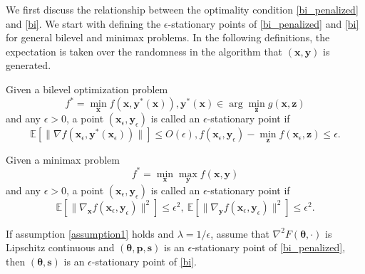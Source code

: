 We first discuss the relationship between the optimality condition \eqref{bi_penalized} and \eqref{bi}. We start with defining the $\epsilon$-stationary points of \eqref{bi_penalized} and \eqref{bi} for general bilevel and minimax problems. In the following definitions, the expectation is taken over the randomness in the algorithm that $({ \mathbf{x}},{ \mathbf{y}})$ is generated.

\begin{definition}
Given a bilevel optimization problem $$f^*=\min_{ \mathbf{x}} f({ \mathbf{x}},{ \mathbf{y}}^*({ \mathbf{x}})), { \mathbf{y}}^*({ \mathbf{x}})\in \arg\min_{ \mathbf{z}} g({ \mathbf{x}},{ \mathbf{z}})$$ and any $\epsilon>0$, a point $({ \mathbf{x}}_\epsilon,{ \mathbf{y}}_\epsilon)$ is called an $\epsilon$-stationary point if 
$$\mathbb{E}[\|\nabla f({ \mathbf{x}}_\epsilon,{ \mathbf{y}}^*({ \mathbf{x}}_\epsilon))\|]\leq O(\epsilon), f({ \mathbf{x}}_\epsilon,{ \mathbf{y}}_\epsilon)-\min_{ \mathbf{z}} f({ \mathbf{x}}_\epsilon,{ \mathbf{z}})\leq \epsilon.$$
\end{definition}

\begin{definition}
\label{definition1}
Given a minimax problem $$f^*=\min_{ \mathbf{x}}\max_{ \mathbf{y}} f({ \mathbf{x}},{ \mathbf{y}})$$ and any $\epsilon>0$, a point $({ \mathbf{x}}_\epsilon,{ \mathbf{y}}_\epsilon)$ is called an $\epsilon$-stationary point if 
$$\mathbb{E}[\|\nabla_{ \mathbf{x}} f({ \mathbf{x}}_\epsilon,{ \mathbf{y}}_\epsilon)\|^2]\leq\epsilon^2,\ \mathbb{E}[\|\nabla_{ \mathbf{y}} f({ \mathbf{x}}_\epsilon,{ \mathbf{y}}_\epsilon)\|^2]\leq\epsilon^2.$$
\end{definition}



\begin{lemma}
\label{lemma1}
    If assumption \ref{assumption1} holds and $\lambda=1/\epsilon$, assume that $\nabla^2 F({ \mathbf{{ \bm{\theta}}}},\cdot)$ is Lipschitz continuous and $({ \mathbf{{ \bm{\theta}}}},{ \mathbf{p}},{ \mathbf{s}})$ is an $\epsilon$-stationary point of \eqref{bi_penalized}, then $({ \mathbf{{ \bm{\theta}}}}, { \mathbf{s}})$ is an $\epsilon$-stationary point of \eqref{bi}.
\end{lemma}


